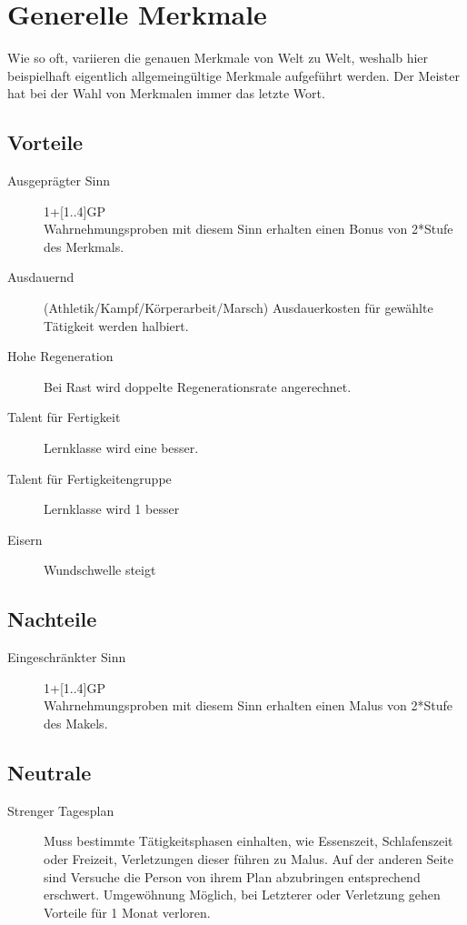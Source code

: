 \documentclass[a4paper,12pt,oneside]{book}
\begin{document}
\section{Generelle Merkmale}
Wie so oft, variieren die genauen Merkmale von Welt zu Welt, weshalb hier beispielhaft eigentlich allgemeingültige Merkmale aufgeführt werden. Der Meister hat bei der Wahl von Merkmalen immer das letzte Wort.
\subsection{Vorteile}
\begin{description}
\item[Ausgeprägter Sinn]1+[1..4]GP
\\Wahrnehmungsproben mit diesem Sinn erhalten einen Bonus von 2*Stufe des Merkmals.
\item[Ausdauernd] (Athletik/Kampf/Körperarbeit/Marsch) Ausdauerkosten für gewählte Tätigkeit werden halbiert.
\item[Hohe Regeneration] Bei Rast wird doppelte Regenerationsrate angerechnet.
\item[Talent für Fertigkeit] Lernklasse wird eine besser.
\item[Talent für Fertigkeitengruppe] Lernklasse wird 1 besser
\item[Eisern] Wundschwelle steigt
\end{description}

\subsection{Nachteile}
\begin{description}
\item[Eingeschränkter Sinn]1+[1..4]GP
\\Wahrnehmungsproben mit diesem Sinn erhalten einen Malus von 2*Stufe des Makels.
\end{description}

\subsection{Neutrale}
\begin{description}
\item[Strenger Tagesplan] Muss bestimmte Tätigkeitsphasen einhalten, wie Essenszeit, Schlafenszeit oder Freizeit, Verletzungen dieser führen zu Malus. Auf der anderen Seite sind Versuche die Person von ihrem Plan abzubringen entsprechend erschwert. Umgewöhnung Möglich, bei Letzterer oder Verletzung gehen Vorteile für 1 Monat verloren.
\end{description}    
\end{document}
